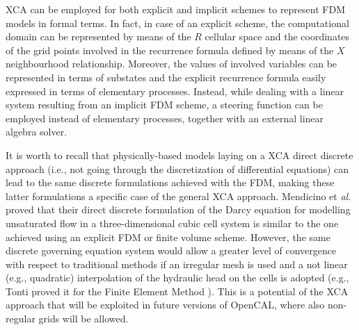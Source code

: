     XCA can be employed for both explicit and implicit schemes to
    represent FDM models in formal terms. In fact, in case of an
    explicit scheme, the computational domain can be represented by
    means of the $R$ cellular space and the coordinates of the grid
    points involved in the recurrence formula defined by means of the
    $X$ neighbourhood relationship. Moreover, the values of involved
    variables can be represented in terms of substates and the
    explicit recurrence formula easily expressed in terms of
    elementary processes. Instead, while dealing with a linear system
    resulting from an implicit FDM scheme, a steering function can be
    employed instead of elementary processes, together with an
    external linear algebra solver.

    It is worth to recall that physically-based models laying on a XCA
    direct discrete approach (i.e., not going through the
    discretization of differential equations) can lead to the same
    discrete formulations achieved with the FDM, making these latter
    formulations a specific case of the general XCA
    approach. Mendicino et \emph{al}. \cite{Mendicino2006} proved that
    their direct discrete formulation of the Darcy equation for
    modelling unsaturated flow in a three-dimensional cubic cell
    system is similar to the one achieved using an explicit FDM or
    finite volume scheme. However, the same discrete governing
    equation system would allow a greater level of convergence with
    respect to traditional methods if an irregular mesh is used
    and a not linear (e.g., quadratic) interpolation of the hydraulic
    head on the cells is adopted (e.g., Tonti proved it for the Finite
    Element Method \cite{Tonti2001237}). This is a potential of the XCA
    approach that will be exploited in future versions of OpenCAL,
    where also non-regular grids will be allowed.